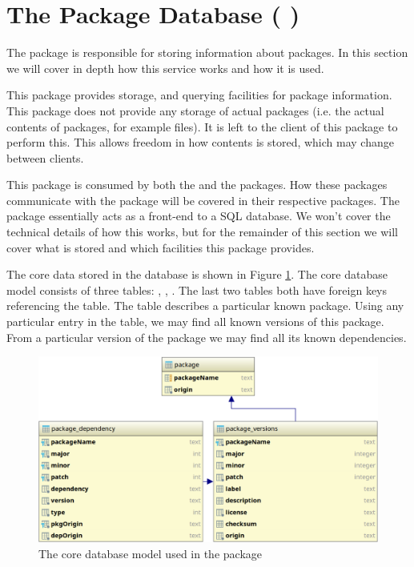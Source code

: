 \section{The Package Database ( \regdb)}
\label{sec:regdb}

The \regdb package is responsible for storing information about packages. In
this section we will cover in depth how this service works and how it is used.

This package provides storage, and querying facilities for package information.
This package does not provide any storage of actual packages (i.e. the actual
contents of packages, for example  files). It is left to the client
of this package to perform this. This allows freedom in how contents is stored,
which may change between clients.

This package is consumed by both the \registry and the \cache packages. How
these packages communicate with the \regdb package will be covered in their
respective packages. The \regdb package essentially acts as a front-end to a
SQL database. We won't cover the technical details of how this works, but for
the remainder of this section we will cover what is stored and which facilities
this package provides.

The core data stored in the database is shown in Figure
\ref{fig:registry_database}. The core database model consists of three tables:
, , . The last
two tables both have foreign keys referencing the  table. The
 table describes a particular known package. Using any particular
entry in the  table, we may find all known versions of this
package. From a particular version of the package we may find all its known
dependencies.

\begin{figure}[H]
    \centering
    \includegraphics[width=1.0\textwidth]{pictures/regdb.png}
    \caption{The core database model used in the \regdb package}
    \label{fig:registry_database}
\end{figure}

